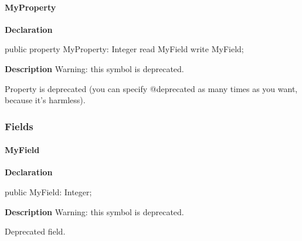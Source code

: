 \documentclass{report}
\begin{document}
\paragraph*{MyProperty}\hspace*{\fill}

\begin{list}{}{
\setlength{\itemindent}{0cm}
\setlength{\listparindent}{0cm}
\setlength{\leftmargin}{\evensidemargin}
\addtolength{\leftmargin}{\tmplength}
\settowidth{\labelsep}{X}
\addtolength{\leftmargin}{\labelsep}
\setlength{\labelwidth}{\tmplength}
}
\begin{flushleft}
\item[\textbf{Declaration}\hfill]
\begin{ttfamily}
public property MyProperty: Integer read MyField write MyField;\end{ttfamily}


\end{flushleft}
\par
\item[\textbf{Description}]
Warning: this symbol is deprecated.

    Property is deprecated (you can specify @deprecated as many times as you want, because it's harmless).

\end{list}
\subsubsection*{\large{\textbf{Fields}}\normalsize\hspace{1ex}\hfill}
\paragraph*{MyField}\hspace*{\fill}

\begin{list}{}{
\setlength{\itemindent}{0cm}
\setlength{\listparindent}{0cm}
\setlength{\leftmargin}{\evensidemargin}
\addtolength{\leftmargin}{\tmplength}
\settowidth{\labelsep}{X}
\addtolength{\leftmargin}{\labelsep}
\setlength{\labelwidth}{\tmplength}
}
\begin{flushleft}
\item[\textbf{Declaration}\hfill]
\begin{ttfamily}
public MyField: Integer;\end{ttfamily}


\end{flushleft}
\par
\item[\textbf{Description}]
Warning: this symbol is deprecated.

Deprecated field. 

\end{list}
\end{document}
